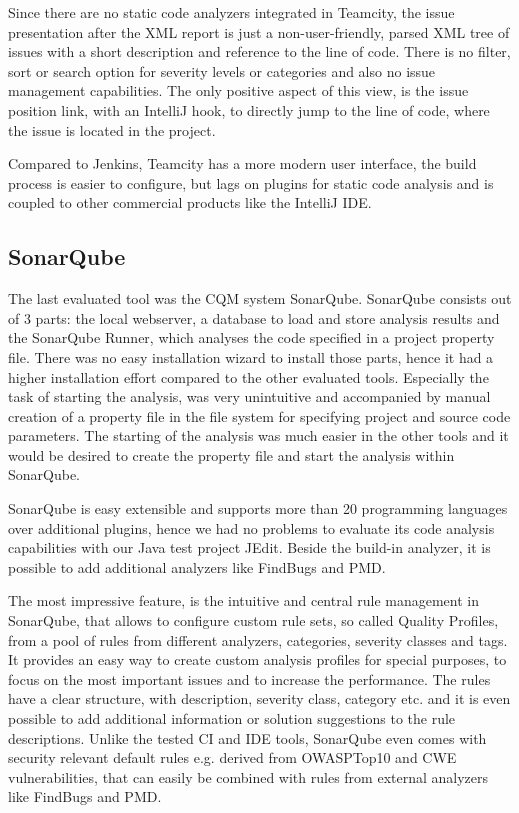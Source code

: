 \documentclass[conference]{IEEEtran}
\begin{document}
Since there are no static code analyzers integrated in Teamcity, the issue presentation after the XML report is just a non-user-friendly, parsed XML tree of issues with a short description and reference to the line of code.
There is no filter, sort or search option for severity levels or categories and also no issue management capabilities.
The only positive aspect of this view, is the issue position link, with an IntelliJ hook, to directly jump to the line of code, where the issue is located in the project.


Compared to Jenkins, Teamcity has a more modern user interface, the build process is easier to configure, but lags on plugins for static code analysis and is coupled to other commercial products like the IntelliJ IDE.


\subsection{SonarQube}
\label{subsec:evaluation_sonarqube}

The last evaluated tool was the CQM system SonarQube.
SonarQube consists out of 3 parts: the local webserver, a database to load and store analysis results and the SonarQube Runner, which analyses the code specified in a project property file.
There was no easy installation wizard to install those parts, hence it had a higher installation effort compared to the other evaluated tools.
Especially the task of starting the analysis, was very unintuitive and accompanied by manual creation of a property file in the file system for specifying project and source code parameters.
The starting of the analysis was much easier in the other tools and it would be desired to create the property file and start the analysis within SonarQube.


SonarQube is easy extensible and supports more than 20 programming languages over additional plugins, hence we had no problems to evaluate its code analysis capabilities with our Java test project JEdit.
Beside the build-in analyzer, it is possible to add additional analyzers like FindBugs and PMD.


The most impressive feature, is the intuitive and central rule management in SonarQube, that allows to configure custom rule sets, so called Quality Profiles, from a pool of rules from different analyzers, categories, severity classes and tags.
It provides an easy way to create custom analysis profiles for special purposes, to focus on the most important issues and to increase the performance.
The rules have a clear structure, with description, severity class, category etc. and it is even possible to add additional information or solution suggestions to the rule descriptions.
Unlike the tested CI and IDE tools, SonarQube even comes with security relevant default rules e.g. derived from OWASPTop10 and CWE vulnerabilities, that can easily be combined with rules from external analyzers like FindBugs and PMD.
\end{document}
